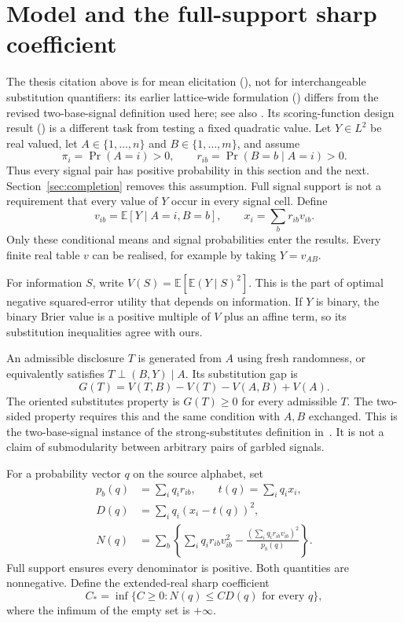 \documentclass[11pt,a4paper]{article}
\newcommand{\E}{\mathbb E}
\begin{document}
\section{Model and the full-support sharp coefficient}
The thesis citation above is for mean elicitation (\cite[Definition 2.21]{Thesis}), not for interchangeable substitution quantifiers: its earlier lattice-wide formulation (\cite[Definitions 2.8--2.9]{Thesis}) differs from the revised two-base-signal definition used here; see also \cite[Definition 2.2.3 and footnote 4]{CW}. Its scoring-function design result (\cite[Theorem 4.2]{Thesis}) is a different task from testing a fixed quadratic value.
Let $Y\in L^2$ be real valued, let $A\in\{1,\ldots,n\}$ and $B\in\{1,\ldots,m\}$, and assume
\[
 \pi_i=\Pr(A=i)>0,\qquad r_{ib}=\Pr(B=b\mid A=i)>0.
\]
Thus every signal pair has positive probability in this section and the next. Section~\ref{sec:completion} removes this assumption. Full signal support is not a requirement that every value of $Y$ occur in every signal cell. Define
\[
 v_{ib}=\E[Y\mid A=i,B=b],\qquad x_i=\sum_b r_{ib}v_{ib}.
\]
Only these conditional means and signal probabilities enter the results. Every finite real table $v$ can be realised, for example by taking $Y=v_{AB}$.

For information $S$, write $V(S)=\E[\E(Y\mid S)^2]$. This is the part of optimal negative squared-error utility that depends on information. If $Y$ is binary, the binary Brier value is a positive multiple of $V$ plus an affine term, so its substitution inequalities agree with ours.

An admissible disclosure $T$ is generated from $A$ using fresh randomness, or equivalently satisfies $T\perp(B,Y)\mid A$. Its substitution gap is
\begin{equation}\label{eq:gap}
 G(T)=V(T,B)-V(T)-V(A,B)+V(A).
\end{equation}
The oriented substitutes property is $G(T)\geq0$ for every admissible $T$. The two-sided property requires this and the same condition with $A,B$ exchanged. This is the two-base-signal instance of the strong-substitutes definition in~\cite[Definition 2.2.3]{CW}. It is not a claim of submodularity between arbitrary pairs of garbled signals.

For a probability vector $q$ on the source alphabet, set
\begin{align}
 p_b(q)&=\sum_iq_ir_{ib},\qquad t(q)=\sum_iq_ix_i,\nonumber\\
 D(q)&=\sum_iq_i(x_i-t(q))^2,\label{eq:D}\\
 N(q)&=\sum_b\left\{\sum_iq_ir_{ib}v_{ib}^2-
 \frac{(\sum_iq_ir_{ib}v_{ib})^2}{p_b(q)}\right\}.\label{eq:N}
\end{align}
Full support ensures every denominator is positive. Both quantities are nonnegative. Define the extended-real sharp coefficient
\[
 C_* = \inf\{C\geq0:N(q)\leq C D(q)\text{ for every }q\},
\]
where the infimum of the empty set is $+\infty$.
\end{document}
